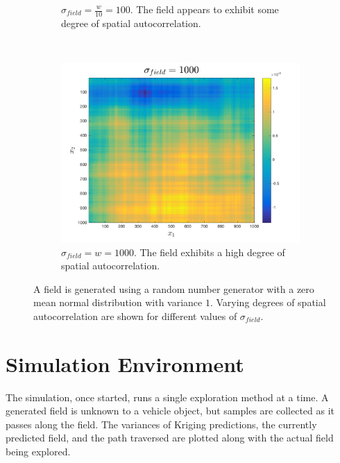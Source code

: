 \begin{figure}[ht!]
\begin{subfigure}[t]{0.33333\textwidth}
        \caption{$\sigma_{field} = \frac{w}{10} = 100$. The field appears to exhibit some degree of spatial autocorrelation.}
    \end{subfigure}%
    ~ 
    \begin{subfigure}[t]{0.33333\textwidth}
        \centering
        \includegraphics[width=\linewidth]{figures/autocorr_sigma_1000.png}
		\captionsetup{skip=0.25\baselineskip,size=footnotesize}
		\ssp
        \caption{$\sigma_{field} = w = 1000$. The field exhibits a high degree of spatial autocorrelation.}
    \end{subfigure}
    \ssp
    \caption{A field is generated using a random number generator with a zero mean normal distribution with variance $1$. Varying degrees of spatial autocorrelation are shown for different values of $\sigma_{field}$.}
\end{figure}

\section{Simulation Environment}
The simulation, once started, runs a single exploration method at a time. A generated field is unknown to a vehicle object, but samples are collected as it passes along the field. The variances of Kriging predictions, the currently predicted field, and the path traversed are plotted along with the actual field being explored.

